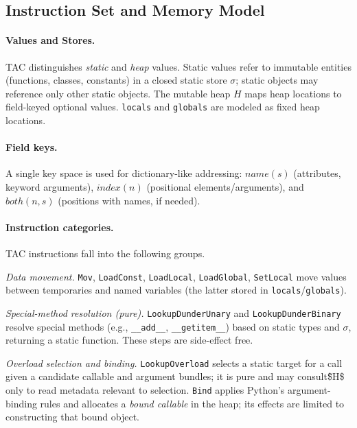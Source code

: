 \subsection{Instruction Set and Memory Model}

\paragraph{Values and Stores.}
TAC distinguishes \emph{static} and \emph{heap} values. Static values refer to immutable entities (functions, classes, constants) in a closed static store $\sigma$; static objects may reference only other static objects. The mutable heap $H$ maps heap locations to field-keyed optional values. \texttt{locals} and \texttt{globals} are modeled as fixed heap locations.

\paragraph{Field keys.}
A single key space is used for dictionary-like addressing:
$\mathit{name}(s)$ (attributes, keyword arguments),
$\mathit{index}(n)$ (positional elements/arguments), and
$\mathit{both}(n,s)$ (positions with names, if needed).

\paragraph{Instruction categories.}
TAC instructions fall into the following groups.

\smallskip
\noindent\emph{Data movement.}
\texttt{Mov}, \texttt{LoadConst}, \texttt{LoadLocal}, \texttt{LoadGlobal}, \texttt{SetLocal} move values between temporaries and named variables (the latter stored in \texttt{locals}/\texttt{globals}).

\smallskip
\noindent\emph{Special-method resolution (pure).}
\texttt{LookupDunderUnary} and \texttt{LookupDunderBinary} resolve special methods (e.g., \texttt{\_\_add\_\_}, \texttt{\_\_getitem\_\_}) based on static types and $\sigma$, returning a static function. These steps are side-effect free.

\smallskip
\noindent\emph{Overload selection and binding.}
\texttt{LookupOverload} selects a static target for a call given a candidate callable and argument bundles; it is pure and may consult\~\$H\$ only to read metadata relevant to selection. \texttt{Bind} applies Python’s argument-binding rules and allocates a \emph{bound callable} in the heap; its effects are limited to constructing that bound object.

